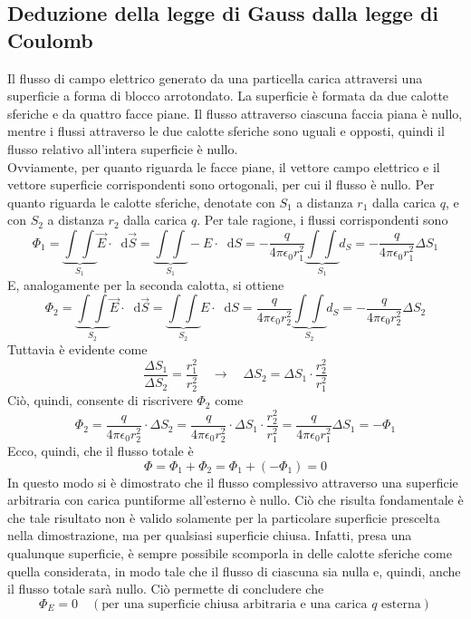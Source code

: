 \documentclass[a4paper]{extarticle}
\newcommand\dif{\mathop{}\!\mathrm{d}}
\begin{document}
\subsection{Deduzione della legge di Gauss dalla legge di Coulomb}
Il flusso di campo elettrico generato da una particella carica attraversi una superficie a forma di blocco arrotondato. La superficie è formata da due calotte sferiche e da quattro facce piane. Il flusso attraverso ciascuna faccia piana è nullo, mentre i flussi attraverso le due calotte sferiche sono uguali e opposti, quindi il flusso relativo all'intera superficie è nullo.\\
Ovviamente, per quanto riguarda le facce piane, il vettore campo elettrico e il vettore superficie corrispondenti sono ortogonali, per cui il flusso è nullo. Per quanto riguarda le calotte sferiche, denotate con $S_1$ a distanza $r_1$ dalla carica $q$, e con $S_2$ a distanza $r_2$ dalla carica $q$. Per tale ragione, i flussi corrispondenti sono
\[\Phi_1 = \underbrace{\int \int}_{S_1} \vec E \cdot \dif \vec S = \underbrace{\int \int}_{S_1} - E \cdot \dif S = -\frac{q}{4 \pi \epsilon_0 r_1^2} \underbrace{\int \int}_{S_1} d_S = -\frac{q}{4 \pi \epsilon_0 r_1^2} \Delta S_1\]
E, analogamente per la seconda calotta, si ottiene
\[\Phi_2 = \underbrace{\int \int}_{S_2} \vec E \cdot \dif \vec S = \underbrace{\int \int}_{S_2} E \cdot \dif S = \frac{q}{4 \pi \epsilon_0 r_2^2} \underbrace{\int \int}_{S_2} d_S = -\frac{q}{4 \pi \epsilon_0 r_2^2} \Delta S_2\]
Tuttavia è evidente come
\[\frac{\Delta S_1}{\Delta S_2} = \frac{r_1^2}{r_2^2} \hspace{1em} \rightarrow \hspace{1em} \Delta S_2 = \Delta S_1 \cdot \frac{r_2^2}{r_1^2}\]
Ciò, quindi, consente di riscrivere $\Phi_2$ come
\[\Phi_2 = \frac{q}{4 \pi \epsilon_0 r_2^2} \cdot \Delta S_2 = \frac{q}{4 \pi \epsilon_0 r_2^2} \cdot \Delta S_1 \cdot \frac{r_2^2}{r_1^2} = \frac{q}{4 \pi \epsilon_0 r_1^2} \Delta S_1 = -\Phi_1\]
Ecco, quindi, che il flusso totale è
\[\Phi = \Phi_1 + \Phi_2 = \Phi_1 + (- \Phi_1) = 0\]
In questo modo si è dimostrato che il flusso complessivo attraverso una superficie arbitraria con carica puntiforme all'esterno è nullo. Ciò che risulta fondamentale è che tale risultato non è valido solamente per la particolare superficie prescelta nella dimostrazione, ma per qualsiasi superficie chiusa. Infatti, presa una qualunque superficie, è sempre possibile scomporla in delle calotte sferiche come quella considerata, in modo tale che il flusso di ciascuna sia nulla e, quindi, anche il flusso totale sarà nullo. Ciò permette di concludere che
\[\boxed{\Phi_E = 0 \hspace{1em} (\text{per una superficie chiusa arbitraria e una carica } q \text{ esterna})}\]
\end{document}
